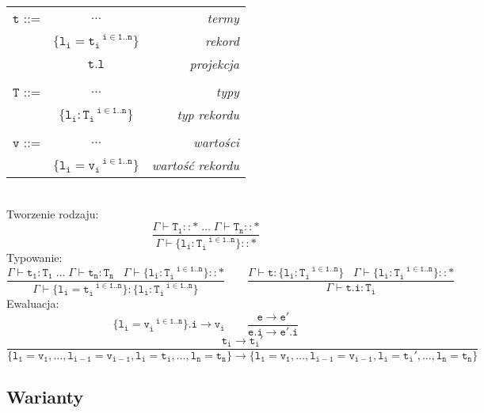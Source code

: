 \documentclass[11pt,leqno]{article}
\begin{document}
\begin{tabular}{| l c r |}
  \hline
  $\mathtt{t}$ ::= & $\dots$ & \textit{termy}  \\
   & $\mathtt{\{l_i=t_i^{\;\;\;i \in 1..n}\}}$ & \textit{rekord} \\
   & $\mathtt{t.l}$ & \textit{projekcja} \\ 
   & & \\
  $\mathtt{T}$ ::= & $\dots$ & \textit{typy}  \\
   & $\mathtt{\{l_i:T_i^{\;\;\;i \in 1..n}\}}$ & \textit{typ rekordu} \\
   & & \\
  $\mathtt{v}$ ::= & $\dots$ & \textit{wartości}  \\
   & $\mathtt{\{l_i=v_i^{\;\;\;i \in 1..n}\}}$ & \textit{wartość rekordu} \\
  \hline
\end{tabular} \\
Tworzenie rodzaju: \\
 	\[\mathtt{
             \frac{\Gamma \vdash T_1::\ast \;\dots\;\Gamma \vdash T_n::\ast}{\Gamma \vdash \{l_i:T_i^{\;\;\;i \in 1..n}\}::\ast}
		}
	\]
Typowanie:
 	\[\mathtt{
             \frac{\Gamma \vdash t_1:T_1 \;\dots\;\Gamma \vdash t_n:T_n \;\;\; \Gamma \vdash \{l_i:T_i^{\;\;\;i \in 1..n}\}::\ast}{\Gamma \vdash \{l_i=t_i^{\;\;\;i \in 1..n}\}:\{l_i:T_i^{\;\;\;i \in 1..n}\}}
           \qquad
           \frac{\Gamma \vdash t : \{l_i:T_i^{\;\;\;i \in 1..n}\} \;\;\; \Gamma \vdash \{l_i:T_i^{\;\;\;i \in 1..n}\}::\ast}{\Gamma \vdash t.i : T_i} 
            }
	\]
Ewaluacja: \\
 	\[\mathtt{
                \{l_i=v_i^{\;\;\;i \in 1..n}\}.i \longrightarrow v_i
                \qquad
                \frac{e \longrightarrow e'}{e.i \longrightarrow e'.i}
		}
	\]
 	\[\mathtt{
                \frac{t_i \longrightarrow t_i'}{\{l_1=v_1, \dots, l_{i-1}=v_{i-1}, l_i=t_i, \dots, l_n=t_n\} \longrightarrow \{l_1=v_1, \dots, l_{i-1}=v_{i-1}, l_i=t_i', \dots, l_n=t_n\}}
		}
	\]

\subsection{Warianty}
\end{document}
